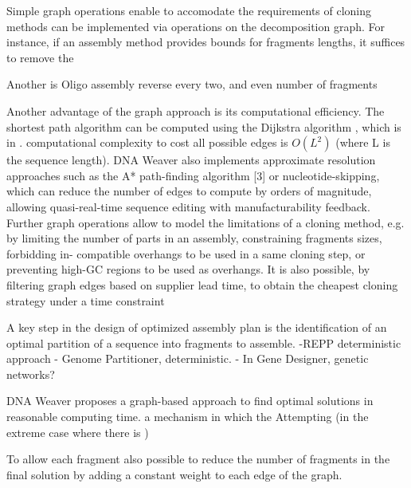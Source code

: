Simple graph operations enable to accomodate the requirements of cloning methods can be implemented via operations on the decomposition graph. For instance, if an assembly method provides bounds for fragments lengths, it suffices to remove the 

Another is Oligo assembly reverse every two, and even number of fragments

Another advantage of the graph approach is its computational efficiency. The shortest path algorithm can be computed using the Dijkstra algorithm \citep{Delling2009}, which is in .  computational complexity to cost all possible edges is $O(L^2)$ (where L is the sequence length).
DNA Weaver also implements approximate resolution approaches such as the A*
path-finding algorithm [3] or nucleotide-skipping, which
can reduce the number of edges to compute by orders of
magnitude, allowing quasi-real-time sequence editing with
manufacturability feedback.
Further graph operations allow to model the limitations
of a cloning method, e.g. by limiting the number of parts
in an assembly, constraining fragments sizes, forbidding in-
compatible overhangs to be used in a same cloning step,
or preventing high-GC regions to be used as overhangs. It
is also possible, by filtering graph edges based on supplier
lead time, to obtain the cheapest cloning strategy under a
time constraint




A key step in the design of optimized assembly plan is the identification of an optimal partition of a sequence into fragments to assemble.
-REPP deterministic approach
- Genome Partitioner, deterministic.
- In Gene Designer, genetic networks?

DNA Weaver proposes a graph-based approach to find optimal solutions in reasonable computing time. a mechanism in which the Attempting (in the extreme case where there is )




To allow each fragment also possible to reduce the number of fragments in the final solution by adding a constant weight to each edge of the graph.


